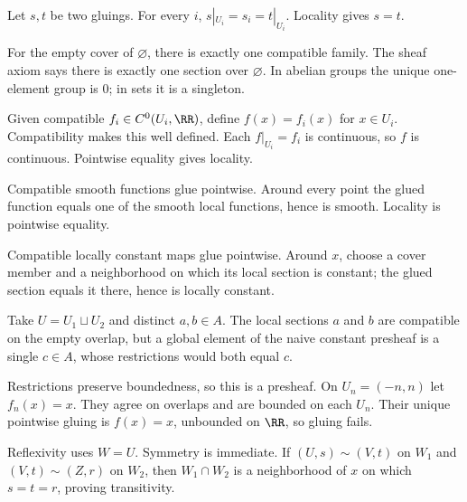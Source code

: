 \begin{solution}
Let $s,t$ be two gluings. For every $i$, $s|_{U_i}=s_i=t|_{U_i}$. Locality gives $s=t$.
\end{solution}

\begin{solution}
For the empty cover of $\varnothing$, there is exactly one compatible family. The sheaf axiom says there is exactly one section over $\varnothing$. In abelian groups the unique one-element group is $0$; in sets it is a singleton.
\end{solution}

\begin{solution}
Given compatible $f_i\in C^0(U_i,\RR)$, define $f(x)=f_i(x)$ for $x\in U_i$. Compatibility makes this well defined. Each $f|_{U_i}=f_i$ is continuous, so $f$ is continuous. Pointwise equality gives locality.
\end{solution}

\begin{solution}
Compatible smooth functions glue pointwise. Around every point the glued function equals one of the smooth local functions, hence is smooth. Locality is pointwise equality.
\end{solution}

\begin{solution}
Compatible locally constant maps glue pointwise. Around $x$, choose a cover member and a neighborhood on which its local section is constant; the glued section equals it there, hence is locally constant.
\end{solution}

\begin{solution}
Take $U=U_1\sqcup U_2$ and distinct $a,b\in A$. The local sections $a$ and $b$ are compatible on the empty overlap, but a global element of the naive constant presheaf is a single $c\in A$, whose restrictions would both equal $c$.
\end{solution}

\begin{solution}
Restrictions preserve boundedness, so this is a presheaf. On $U_n=(-n,n)$ let $f_n(x)=x$. They agree on overlaps and are bounded on each $U_n$. Their unique pointwise gluing is $f(x)=x$, unbounded on $\RR$, so gluing fails.
\end{solution}

\begin{solution}
Reflexivity uses $W=U$. Symmetry is immediate. If $(U,s)\sim(V,t)$ on $W_1$ and $(V,t)\sim(Z,r)$ on $W_2$, then $W_1\cap W_2$ is a neighborhood of $x$ on which $s=t=r$, proving transitivity.
\end{solution}

